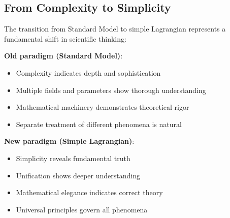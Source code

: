 	\subsection{From Complexity to Simplicity}
	
	The transition from Standard Model to simple Lagrangian represents a fundamental shift in scientific thinking:
	
	\textbf{Old paradigm (Standard Model)}:
	\begin{itemize}
		\item Complexity indicates depth and sophistication
		\item Multiple fields and parameters show thorough understanding
		\item Mathematical machinery demonstrates theoretical rigor
		\item Separate treatment of different phenomena is natural
	\end{itemize}
	
	\textbf{New paradigm (Simple Lagrangian)}:
	\begin{itemize}
		\item Simplicity reveals fundamental truth
		\item Unification shows deeper understanding
		\item Mathematical elegance indicates correct theory
		\item Universal principles govern all phenomena
	\end{itemize}
